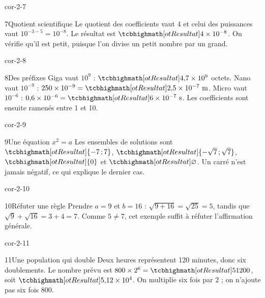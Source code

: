 \begin{blocLivre}{cor-2-7}\begin{corrige}{7}{Quotient scientifique}
Le quotient des coefficients vaut 4 et celui des puissances vaut $10^{-3-5}=10^{-8}$. Le résultat est $\res{4\times10^{-8}}$. On vérifie qu’il est petit, puisque l’on divise un petit nombre par un grand.
\end{corrige}\end{blocLivre}
\begin{blocLivre}{cor-2-8}\begin{corrige}{8}{Des préfixes}
Giga vaut $10^9$ : $\res{4{,}7\times10^9}$ octets. Nano vaut $10^{-9}$ : $250\times10^{-9}=\res{2{,}5\times10^{-7}\text{ m}}$. Micro vaut $10^{-6}$ : $0{,}6\times10^{-6}=\res{6\times10^{-7}\text{ s}}$. Les coefficients sont ensuite ramenés entre 1 et 10.
\end{corrige}\end{blocLivre}
\begin{blocLivre}{cor-2-9}\begin{corrige}{9}{Une équation $x^2=a$}
Les ensembles de solutions sont $\res{\{-7\,;7\}}$, $\res{\{-\sqrt7\,;\sqrt7\}}$, $\res{\{0\}}$ et $\res{\varnothing}$. Un carré n’est jamais négatif, ce qui explique le dernier cas.
\end{corrige}\end{blocLivre}
\begin{blocLivre}{cor-2-10}\begin{corrige}{10}{Réfuter une règle}
Prendre $a=9$ et $b=16$ : $\sqrt{9+16}=\sqrt{25}=5$, tandis que $\sqrt9+\sqrt{16}=3+4=7$. Comme $5\ne7$, cet exemple suffit à réfuter l’affirmation générale.
\end{corrige}\end{blocLivre}
\begin{blocLivre}{cor-2-11}\begin{corrige}{11}{Une population qui double}
Deux heures représentent 120 minutes, donc six doublements. Le nombre prévu est $800\times2^6=\res{51200}$, soit $\res{5{,}12\times10^4}$. On multiplie six fois par 2 ; on n’ajoute pas six fois 800.
\end{corrige}\end{blocLivre}
